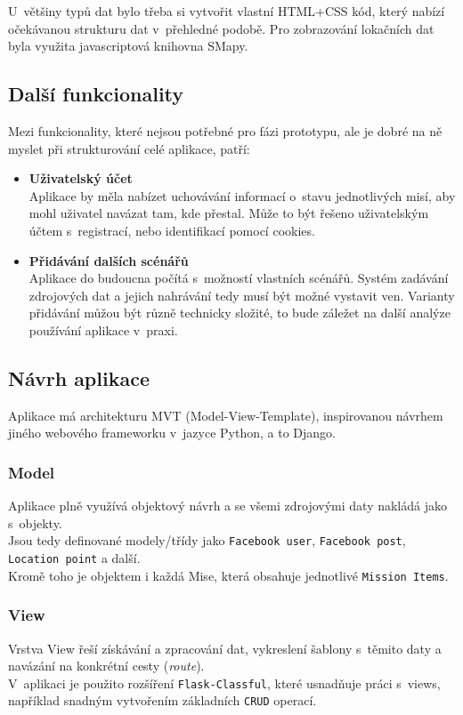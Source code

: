 	U~většiny typů dat bylo třeba si vytvořit vlastní HTML+CSS kód, který nabízí očekávanou strukturu dat v~přehledné podobě.
	Pro zobrazování lokačních dat byla využita javascriptová knihovna SMapy.   


\subsection{Další funkcionality}
Mezi funkcionality, které nejsou potřebné pro fázi prototypu, ale je dobré na ně myslet při strukturování celé aplikace, patří:

\begin{itemize}
	\item \textbf{Uživatelský účet}\\
		Aplikace by měla nabízet uchovávání informací o~stavu jednotlivých misí, aby mohl uživatel navázat tam, kde přestal.
		Může to být řešeno uživatelským účtem s~registrací, nebo identifikací pomocí cookies.

	\item \textbf{Přidávání dalších scénářů}\\
		Aplikace do budoucna počítá s~možností vlastních scénářů. Systém zadávání zdrojových dat a jejich nahrávání tedy musí být možné vystavit ven.
		Varianty přidávání můžou být různě technicky složité, to bude záležet na další analýze používání aplikace v~praxi.		


\end{itemize} 

\subsection{Návrh aplikace}
Aplikace má architekturu MVT (Model-View-Template), inspirovanou návrhem jiného webového frameworku v~jazyce Python, a to Django.

\subsubsection*{Model}
Aplikace plně využívá objektový návrh a se všemi zdrojovými daty nakládá jako s~objekty.\\
Jsou tedy definované modely/třídy jako \verb|Facebook user|, \verb|Facebook post|, \verb|Location point| a další.\\
Kromě toho je objektem i každá Mise, která obsahuje jednotlivé \verb|Mission Items|.

\subsubsection*{View}
Vrstva View řeší získávání a zpracování dat, vykreslení šablony s~těmito daty a navázání na konkrétní cesty (\textit{route}).\\
V~aplikaci je použito rozšíření \verb|Flask-Classful|, které usnadňuje práci s~views, například snadným vytvořením základních \verb|CRUD| operací.

